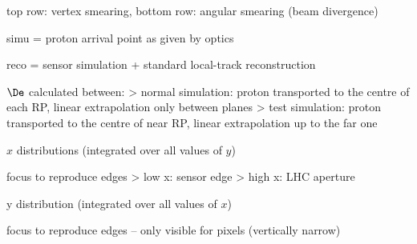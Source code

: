 \> top row: vertex smearing, bottom row: angular smearing (beam divergence)

\centerline{}



\newpage %

\SmallerFonts

\> simu = proton arrival point as given by optics

\> reco = sensor simulation + standard local-track reconstruction

\centerline{}



\newpage %

\SmallerFonts

\> $\De$ calculated between:
\>> normal simulation: proton transported to the centre of each RP, linear extrapolation only between planes
\>> test simulation: proton transported to the centre of near RP, linear extrapolation up to the far one

\centerline{}


\newpage %

\SmallerFonts

\> $x$ distributions (integrated over all values of $y$)

\> focus to reproduce edges
\>> low x: sensor edge
\>> high x: LHC aperture

\centerline{}



\newpage %

\SmallerFonts

\> y distribution (integrated over all values of $x$)

\> focus to reproduce edges -- only visible for pixels (vertically narrow)

